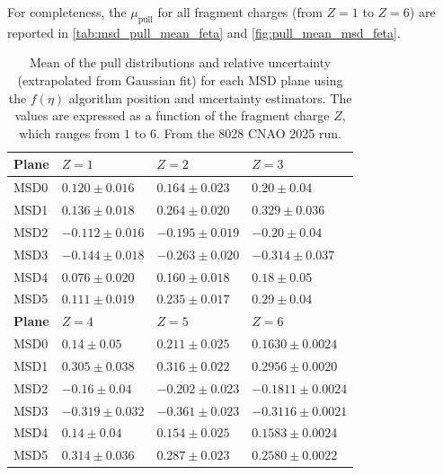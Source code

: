 For completeness, the $\mu_{\text{pull}}$ for all fragment charges (from $Z=1$ to $Z=6$) are reported in \autoref{tab:msd_pull_mean_feta} and \autoref{fig:pull_mean_msd_feta}.
\vspace*{\fill}
\clearpage
\vspace*{\fill}
\begin{table}[H]
	\centering
	\renewcommand{\arraystretch}{1.3}
	{\normalsize%
		\begin{tabular}{M{1.8cm} M{2.8cm} M{2.8cm} M{3.1cm}}
			\hline
			\textbf{Plane} & \textbf{$Z=1$} & \textbf{$Z=2$} & \textbf{$Z=3$} \\
			\hline
			MSD0 & $0.120 \pm 0.016$ & $0.164 \pm 0.023$ & $0.20 \pm 0.04$ \\
			MSD1 & $0.136 \pm 0.018$ & $0.264 \pm 0.020$ & $0.329 \pm 0.036$ \\
			MSD2 & $-0.112 \pm 0.016$ & $-0.195 \pm 0.019$ & $-0.20 \pm 0.04$ \\
			MSD3 & $-0.144 \pm 0.018$ & $-0.263 \pm 0.020$ & $-0.314 \pm 0.037$ \\
			MSD4 & $0.076 \pm 0.020$ & $0.160 \pm 0.018$ & $0.18 \pm 0.05$ \\
			MSD5 & $0.111 \pm 0.019$ & $0.235 \pm 0.017$ & $0.29 \pm 0.04$ \\
			\hline\hline
			\textbf{Plane} & \textbf{$Z=4$} & \textbf{$Z=5$} & \textbf{$Z=6$} \\
			\hline
			MSD0 & $0.14 \pm 0.05$ & $0.211 \pm 0.025$ & $0.1630 \pm 0.0024$ \\
			MSD1 & $0.305 \pm 0.038$ & $0.316 \pm 0.022$ & $0.2956 \pm 0.0020$ \\
			MSD2 & $-0.16 \pm 0.04$ & $-0.202 \pm 0.023$ & $-0.1811 \pm 0.0024$ \\
			MSD3 & $-0.319 \pm 0.032$ & $-0.361 \pm 0.023$ & $-0.3116 \pm 0.0021$ \\
			MSD4 & $0.14 \pm 0.04$ & $0.154 \pm 0.025$ & $0.1583 \pm 0.0024$ \\
			MSD5 & $0.314 \pm 0.036$ & $0.287 \pm 0.023$ & $0.2580 \pm 0.0022$ \\
			\hline
	\end{tabular}}
	\caption[MSD pull mean by fragment charge using the $f(\eta)$ algorithm]{Mean of the pull distributions and relative uncertainty (extrapolated from Gaussian fit) for each MSD plane using the $f(\eta)$ algorithm position and uncertainty estimators. The values are expressed as a function of the fragment charge $Z$, which ranges from $1$ to $6$. From the 8028 CNAO 2025 run.}
	\label{tab:msd_pull_mean_feta}
\end{table}
